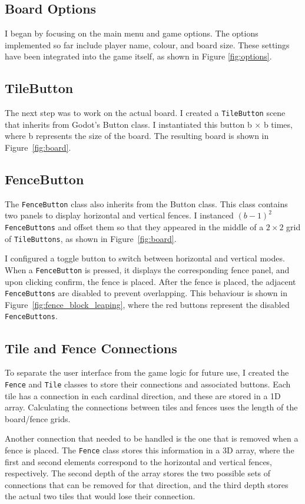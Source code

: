\documentclass[progress]{cmpreport}
\begin{document}
\subsection{Board Options}
I began by focusing on the main menu and game options. The options implemented so far include player name, colour, and board size. These settings have been integrated into the game itself, as shown in Figure \ref{fig:options}.

\subsection{TileButton}
The next step was to work on the actual board. I created a \texttt{TileButton} scene that inherits from Godot's Button class. I instantiated this button b × b times, where b represents the size of the board. The resulting board is shown in Figure~\ref{fig:board}.

\subsection{FenceButton}
The \texttt{FenceButton} class also inherits from the Button class. This class contains two panels to display horizontal and vertical fences. I instanced \((b-1)^2\) \texttt{FenceButtons} and offset them so that they appeared in the middle of a \(2 \times 2\) grid of \texttt{TileButtons}, as shown in Figure~\ref{fig:board}.

\noindent I configured a toggle button to switch between horizontal and vertical modes. When a \texttt{FenceButton} is pressed, it displays the corresponding fence panel, and upon clicking confirm, the fence is placed. After the fence is placed, the adjacent \texttt{FenceButtons} are disabled to prevent overlapping. This behaviour is shown in Figure~\ref{fig:fence_block_leaping}, where the red buttons represent the disabled \texttt{FenceButtons}.  

\subsection{Tile and Fence Connections}
To separate the user interface from the game logic for future use, I created the \texttt{Fence} and \texttt{Tile} classes to store their connections and associated buttons. Each tile has a connection in each cardinal direction, and these are stored in a 1D array. Calculating the connections between tiles and fences uses the length of the board/fence grids.  

Another connection that needed to be handled is the one that is removed when a fence is placed. The \texttt{Fence} class stores this information in a 3D array, where the first and second elements correspond to the horizontal and vertical fences, respectively. The second depth of the array stores the two possible sets of connections that can be removed for that direction, and the third depth stores the actual two tiles that would lose their connection.  
\end{document}
